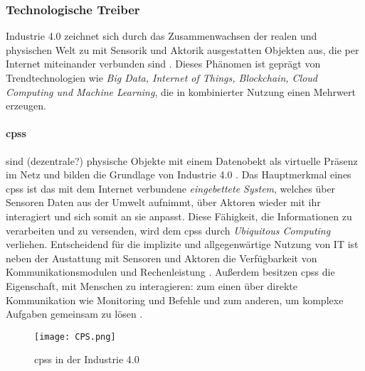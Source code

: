 \subsubsection{Technologische Treiber}

Industrie 4.0 zeichnet sich durch das Zusammenwachsen der realen und physischen Welt zu mit Sensorik und Aktorik ausgestatten Objekten aus, die per Internet miteinander verbunden sind \citep{BITKOM2015}. Dieses Phänomen ist geprägt von Trendtechnologien wie \textit{Big Data, Internet of Things, Blockchain, Cloud Computing und Machine Learning}, die in kombinierter Nutzung einen Mehrwert erzeugen.
\paragraph{\acf{cpss}}
sind (dezentrale?) physische Objekte mit einem Datenobekt als virtuelle Präsenz im Netz und bilden die Grundlage von Industrie 4.0 \citep{Drath2016}. Das Hauptmerkmal eines \ac{cpss} ist das mit dem Internet verbundene \textit{eingebettete System}, welches über Sensoren Daten aus der Umwelt aufnimmt, über Aktoren wieder mit ihr interagiert und sich somit an sie anpasst. Diese Fähigkeit, die Informationen zu verarbeiten und zu versenden, wird dem \ac{cpss} durch \textit{Ubiquitous Computing} verliehen. Entscheidend für die implizite und allgegenwärtige Nutzung von IT  ist neben der Austattung mit Sensoren und Aktoren die Verfügbarkeit von Kommunikationsmodulen und Rechenleistung \citep{Roth2016}.  Außerdem besitzen \ac{cpss} die Eigenschaft, mit Menschen zu interagieren: zum einen über direkte Kommunikation wie Monitoring und Befehle und zum anderen, um komplexe Aufgaben gemeinsam zu lösen \citep{Lueth2016}.


\begin{figure}[ht]
  \centering
  \texttt{[image: CPS.png]}
  \caption[\acf{cpss} in der Industrie 4.0]{\ac{cpss} in der Industrie 4.0 \citep[S. 30]{Roth2016}}
  \label{}
\end{figure}

